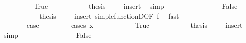 \begin{isabellebody}
\ \ \ \ \ \ \ \ \isamarkupfalse%
\ True\isanewline
\ \ \ \ \ \ \ \ \isamarkupfalse%
\ \isamarkupfalse%
\ {\isacharquery}{\kern0pt}thesis\ \isamarkupfalse%
\ {\isacharasterisk}{\kern0pt}\ \isamarkupfalse%
\ insert\ \isamarkupfalse%
\ simp\isanewline
\ \ \ \ \ \ \isamarkupfalse%
\isanewline
\ \ \ \ \ \ \ \ \isamarkupfalse%
\ False\isanewline
\ \ \ \ \ \ \ \ \isamarkupfalse%
\ \isamarkupfalse%
\ {\isacharquery}{\kern0pt}thesis\ \isamarkupfalse%
\ {\isacharasterisk}{\kern0pt}\ \isamarkupfalse%
\ insert\ simple{\isacharunderscore}{\kern0pt}functionD{\isacharparenleft}{\kern0pt}{}{\isacharparenright}{\kern0pt}{\isacharbrackleft}{\kern0pt}OF\ f{\isacharparenleft}{\kern0pt}{}{\isacharparenright}{\kern0pt}{\isacharbrackright}{\kern0pt}\ \isamarkupfalse%
\ fast\isanewline
\ \ \ \ \ \ \isamarkupfalse%
\isanewline
\ \ \ \ \isamarkupfalse%
\isanewline
\ \ \ \ \ \ \isamarkupfalse%
\ {}\isanewline
\ \ \ \ \ \ \isamarkupfalse%
\ {\isacharquery}{\kern0pt}case\ \isanewline
\ \ \ \ \ \ \isamarkupfalse%
\ {\isacharparenleft}{\kern0pt}cases\ {\isachardoublequoteopen}x\ {\isacharequal}{\kern0pt}\ {}{\isachardoublequoteclose}{\isacharparenright}{\kern0pt}\isanewline
\ \ \ \ \ \ \ \ \isamarkupfalse%
\ True\isanewline
\ \ \ \ \ \ \ \ \isamarkupfalse%
\ \isamarkupfalse%
\ {\isacharquery}{\kern0pt}thesis\ \isamarkupfalse%
\ {\isacharasterisk}{\kern0pt}\ \isamarkupfalse%
\ insert\ \isamarkupfalse%
\ simp\isanewline
\ \ \ \ \ \ \isamarkupfalse%
\isanewline
\ \ \ \ \ \ \ \ \isamarkupfalse%
\ False\isanewline
\ \ \ \ \ \ \ \ \isamarkupfalse%

\end{isabellebody}
